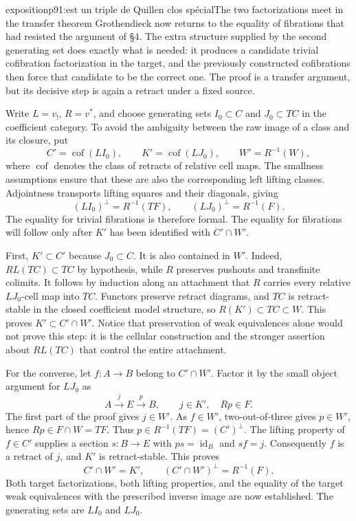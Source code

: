 \begin{dcomment}{exposition}{p91:est un triple de Quillen clos spécial}{The two factorizations meet in the transfer theorem}
Grothendieck now returns to the equality of fibrations that had resisted the argument of \S4. The extra structure supplied by the second generating set does exactly what is needed: it produces a candidate trivial cofibration factorization in the target, and the previously constructed cofibrations then force that candidate to be the correct one. The proof is a transfer argument, but its decisive step is again a retract under a fixed source.

Write $L=v_!$, $R=v^*$, and choose generating sets $I_0\subset C$ and $J_0\subset TC$ in the coefficient category. To avoid the ambiguity between the raw image of a class and its closure, put
\[
 C'=\operatorname{cof}(LI_0),\qquad
 K'=\operatorname{cof}(LJ_0),\qquad
 W'=R^{-1}(W),
\]
where $\operatorname{cof}$ denotes the class of retracts of relative cell maps. The smallness assumptions ensure that these are also the corresponding left lifting classes. Adjointness transports lifting squares and their diagonals, giving
\[
 (LI_0)^{\perp}=R^{-1}(TF),\qquad
 (LJ_0)^{\perp}=R^{-1}(F).
\]
The equality for trivial fibrations is therefore formal. The equality for fibrations will follow only after $K'$ has been identified with $C'\cap W'$.

First, $K'\subset C'$ because $J_0\subset C$. It is also contained in $W'$. Indeed, $RL(TC)\subset TC$ by hypothesis, while $R$ preserves pushouts and transfinite colimits. It follows by induction along an attachment that $R$ carries every relative $LJ_0$-cell map into $TC$. Functors preserve retract diagrams, and $TC$ is retract-stable in the closed coefficient model structure, so $R(K')\subset TC\subset W$. This proves $K'\subset C'\cap W'$. Notice that preservation of weak equivalences alone would not prove this step: it is the cellular construction and the stronger assertion about $RL(TC)$ that control the entire attachment.

For the converse, let $f:A\to B$ belong to $C'\cap W'$. Factor it by the small object argument for $LJ_0$ as
\[
 A\xrightarrow{j}E\xrightarrow{p}B,
 \qquad j\in K',\quad Rp\in F.
\]
The first part of the proof gives $j\in W'$. As $f\in W'$, two-out-of-three gives $p\in W'$, hence $Rp\in F\cap W=TF$. Thus $p\in R^{-1}(TF)=(C')^{\perp}$. The lifting property of $f\in C'$ supplies a section $s:B\to E$ with $ps=\operatorname{id}_B$ and $sf=j$. Consequently $f$ is a retract of $j$, and $K'$ is retract-stable. This proves
\[
 C'\cap W'=K',\qquad
 (C'\cap W')^{\perp}=R^{-1}(F).
\]
Both target factorizations, both lifting properties, and the equality of the target weak equivalences with the prescribed inverse image are now established. The generating sets are $LI_0$ and $LJ_0$.


\end{dcomment}
